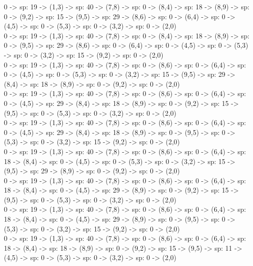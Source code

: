 \documentclass[10pt,a4paper]{article}
\begin{document}
0 -> sp: 19 -> (1,3) -> sp: 40 -> (7,8) -> sp: 0 -> (8,4) -> sp: 18 -> (8,9) -> sp: 0 -> (9,2) -> sp: 15 -> (9,5) -> sp: 29 -> (8,6) -> sp: 0 -> (6,4) -> sp: 0 -> (4,5) -> sp: 0 -> (5,3) -> sp: 0 -> (3,2) -> sp: 0 -> (2,0)\\

0 -> sp: 19 -> (1,3) -> sp: 40 -> (7,8) -> sp: 0 -> (8,4) -> sp: 18 -> (8,9) -> sp: 0 -> (9,5) -> sp: 29 -> (8,6) -> sp: 0 -> (6,4) -> sp: 0 -> (4,5) -> sp: 0 -> (5,3) -> sp: 0 -> (3,2) -> sp: 15 -> (9,2) -> sp: 0 -> (2,0)\\

0 -> sp: 19 -> (1,3) -> sp: 40 -> (7,8) -> sp: 0 -> (8,6) -> sp: 0 -> (6,4) -> sp: 0 -> (4,5) -> sp: 0 -> (5,3) -> sp: 0 -> (3,2) -> sp: 15 -> (9,5) -> sp: 29 -> (8,4) -> sp: 18 -> (8,9) -> sp: 0 -> (9,2) -> sp: 0 -> (2,0)\\

0 -> sp: 19 -> (1,3) -> sp: 40 -> (7,8) -> sp: 0 -> (8,6) -> sp: 0 -> (6,4) -> sp: 0 -> (4,5) -> sp: 29 -> (8,4) -> sp: 18 -> (8,9) -> sp: 0 -> (9,2) -> sp: 15 -> (9,5) -> sp: 0 -> (5,3) -> sp: 0 -> (3,2) -> sp: 0 -> (2,0)\\

0 -> sp: 19 -> (1,3) -> sp: 40 -> (7,8) -> sp: 0 -> (8,6) -> sp: 0 -> (6,4) -> sp: 0 -> (4,5) -> sp: 29 -> (8,4) -> sp: 18 -> (8,9) -> sp: 0 -> (9,5) -> sp: 0 -> (5,3) -> sp: 0 -> (3,2) -> sp: 15 -> (9,2) -> sp: 0 -> (2,0)\\

0 -> sp: 19 -> (1,3) -> sp: 40 -> (7,8) -> sp: 0 -> (8,6) -> sp: 0 -> (6,4) -> sp: 18 -> (8,4) -> sp: 0 -> (4,5) -> sp: 0 -> (5,3) -> sp: 0 -> (3,2) -> sp: 15 -> (9,5) -> sp: 29 -> (8,9) -> sp: 0 -> (9,2) -> sp: 0 -> (2,0)\\

0 -> sp: 19 -> (1,3) -> sp: 40 -> (7,8) -> sp: 0 -> (8,6) -> sp: 0 -> (6,4) -> sp: 18 -> (8,4) -> sp: 0 -> (4,5) -> sp: 29 -> (8,9) -> sp: 0 -> (9,2) -> sp: 15 -> (9,5) -> sp: 0 -> (5,3) -> sp: 0 -> (3,2) -> sp: 0 -> (2,0)\\

0 -> sp: 19 -> (1,3) -> sp: 40 -> (7,8) -> sp: 0 -> (8,6) -> sp: 0 -> (6,4) -> sp: 18 -> (8,4) -> sp: 0 -> (4,5) -> sp: 29 -> (8,9) -> sp: 0 -> (9,5) -> sp: 0 -> (5,3) -> sp: 0 -> (3,2) -> sp: 15 -> (9,2) -> sp: 0 -> (2,0)\\

0 -> sp: 19 -> (1,3) -> sp: 40 -> (7,8) -> sp: 0 -> (8,6) -> sp: 0 -> (6,4) -> sp: 18 -> (8,4) -> sp: 18 -> (8,9) -> sp: 0 -> (9,2) -> sp: 15 -> (9,5) -> sp: 11 -> (4,5) -> sp: 0 -> (5,3) -> sp: 0 -> (3,2) -> sp: 0 -> (2,0)\\
\end{document}
